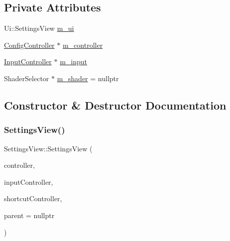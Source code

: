 \subsection*{Private Attributes}
\begin{DoxyCompactItemize}
\item 
Ui\+::\+Settings\+View \mbox{\hyperlink{class_q_g_b_a_1_1_settings_view_aee2f0aa0185391074d99b59a5c577735}{m\+\_\+ui}}
\item 
\mbox{\hyperlink{class_q_g_b_a_1_1_config_controller}{Config\+Controller}} $\ast$ \mbox{\hyperlink{class_q_g_b_a_1_1_settings_view_a833c971ea56f66d4c3960744d88715c8}{m\+\_\+controller}}
\item 
\mbox{\hyperlink{class_q_g_b_a_1_1_input_controller}{Input\+Controller}} $\ast$ \mbox{\hyperlink{class_q_g_b_a_1_1_settings_view_a60926d05f16f854a1753a7d8ded96987}{m\+\_\+input}}
\item 
Shader\+Selector $\ast$ \mbox{\hyperlink{class_q_g_b_a_1_1_settings_view_a1cc5b9f97059c62ea16905828f3253a9}{m\+\_\+shader}} = nullptr
\end{DoxyCompactItemize}


\subsection{Constructor \& Destructor Documentation}
\mbox{\label{class_q_g_b_a_1_1_settings_view_aab1ad8a93c4118a33534328f70ecb54f}} 
\subsubsection{\texorpdfstring{Settings\+View()}{SettingsView()}}
{\footnotesize\ttfamily Settings\+View\+::\+Settings\+View (\begin{DoxyParamCaption}\item[{\mbox{\hyperlink{class_q_g_b_a_1_1_config_controller}{Config\+Controller}} $\ast$}]{controller,  }\item[{\mbox{\hyperlink{class_q_g_b_a_1_1_input_controller}{Input\+Controller}} $\ast$}]{input\+Controller,  }\item[{\mbox{\hyperlink{class_q_g_b_a_1_1_shortcut_controller}{Shortcut\+Controller}} $\ast$}]{shortcut\+Controller,  }\item[{Q\+Widget $\ast$}]{parent = {\ttfamily nullptr} }\end{DoxyParamCaption})}


